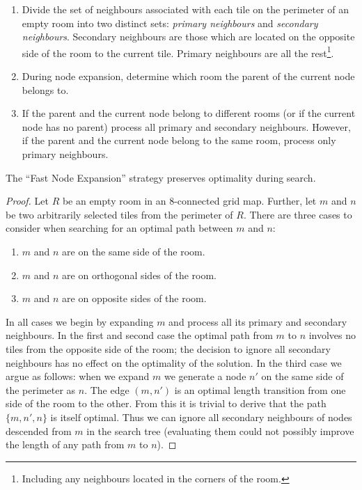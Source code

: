 
\begin{enumerate}
\item{Divide the set of neighbours associated with each tile on the perimeter of an empty room into two distinct sets:
\emph{primary neighbours} and \emph{secondary neighbours}.
Secondary neighbours are those which are located on the opposite side of the room to the current tile. 
Primary neighbours are all the rest\footnote{Including any neighbours located in the corners of the
room.}.}
\item{During node expansion, determine which room the parent of the current node belongs to.}
\item{If the parent and the current node belong to different rooms (or if the current node has no parent) 
process all primary and secondary neighbours.
However, if the parent and the current node belong to the same room, process only primary neighbours.}
\end{enumerate}

\begin{lemma}
The ``Fast Node Expansion'' strategy preserves optimality during search.
\end{lemma}
\begin{proof}
Let $R$ be an empty room in an 8-connected grid map.
Further, let $m$ and $n$ be two arbitrarily selected tiles from the perimeter of $R$.
There are three cases to consider when searching for an optimal path between $m$ and $n$:
\begin{enumerate}
\item{$m$ and $n$ are on the same side of the room.}
\item{$m$ and $n$ are on orthogonal sides of the room.}
\item{$m$ and $n$ are on opposite sides of the room.}
\end{enumerate}
In all cases we begin by expanding $m$ and process all its primary and secondary neighbours.
In the first and second case the optimal path from $m$ to $n$ involves no tiles from the opposite side of the room;
the decision to ignore all secondary neighbours has no effect on the optimality of the solution.
In the third case we argue as follows:
when we expand $m$ we generate a node $n'$ on the same side of the perimeter as $n$.
The edge $(m, n')$ is an optimal length transition from one side of the room to the other.
From this it is trivial to derive that the path $\lbrace m, n', n \rbrace$ is itself optimal.
Thus we can ignore all secondary neighbours of nodes descended from $m$ in the search tree
(evaluating them could not possibly improve the length of any path from $m$ to $n$).
\end{proof}



